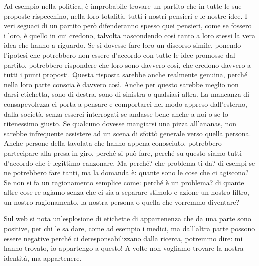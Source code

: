 \documentclass[12pt]{book} %
\begin{document}
Ad esempio nella politica, è improbabile trovare un partito che in tutte le sue proposte rispecchino, nella loro totalità,
 tutti i nostri pensieri e le nostre idee. I veri seguaci di un partito però difenderanno spesso quei pensieri, come se
fossero i loro, è quello in cui credono, talvolta nascondendo così tanto a loro stessi la vera idea che hanno a riguardo. Se si
dovesse fare loro un discorso simile, ponendo l'ipotesi che potrebbero non essere
d'accordo con tutte le idee promosse dal partito, potrebbero rispondere che loro sono davvero così, che
credono davvero a tutti i punti proposti. Questa risposta sarebbe anche realmente genuina, perché nella loro parte
conscia è davvero così. Anche per questo sarebbe meglio non darsi etichetta, sono di destra, sono di sinistra o
qualsiasi altra. La mancanza di consapevolezza ci porta a pensare e comportarci nel modo appreso
dall'esterno, dalla società, senza esserci interrogati se andasse bene anche a noi o se lo ritenessimo giusto.
Se qualcuno dovesse mangiarsi una pizza all'ananas, non sarebbe infrequente assistere ad un scena di sfottò generale verso quella persona. Anche persone della tavolata che hanno appena conosciuto, potrebbero partecipare alla presa in giro, perché si può fare, perché su questo siamo tutti d'accordo che è legittimo canzonare. Ma perché? che problema ti da? di esempi se ne potrebbero fare tanti, ma la domanda è: quante sono le cose che ci agiscono? Se non si fa un ragionamento semplice come: perché è un problema? di quante altre cose re-agiamo senza che ci sia a separare stimolo e azione un nostro filtro, un nostro ragionamento, la nostra persona o quella che vorremmo diventare?

Sul web si nota un'esplosione di etichette di appartenenza che da una parte sono positive, per chi le sa dare, come ad esempio i medici, ma dall'altra parte possono essere negative perché ci deresponsabilizzano dalla ricerca, potremmo dire: mi hanno trovato, io appartengo a questo!
A volte non vogliamo trovare la nostra identità, ma appartenere. 
\end{document}
